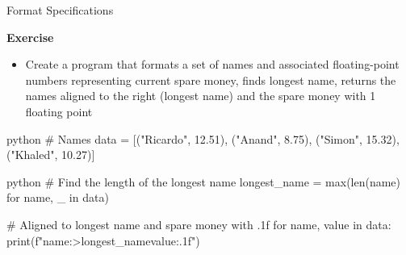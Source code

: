 \documentclass[
	11pt, 
]{beamer}
\begin{document}

\begin{frame}[fragile]{Format Specifications}

\begin{alertblock}{\textbf{Exercise}}
\begin{itemize}
    \item Create a program that formats a set of names and associated floating-point numbers representing current spare money, finds longest name, returns the names aligned to the right (longest name) and the spare money with 1 floating point
\end{itemize}
\begin{mintedbox}{python}
# Names
data = [("Ricardo",  12.51), ("Anand",     8.75),
        ("Simon",    15.32), ("Khaled",   10.27)]
\end{mintedbox} 
\end{alertblock}
\pause
\begin{mintedbox}{python}
# Find the length of the longest name
longest_name = max(len(name) for name, _ in data)

# Aligned to longest name and spare money with .1f
for name, value in data:
    print(f"{name:>{longest_name}}{value:.1f}")
\end{mintedbox} 
\end{frame}

\end{document}

